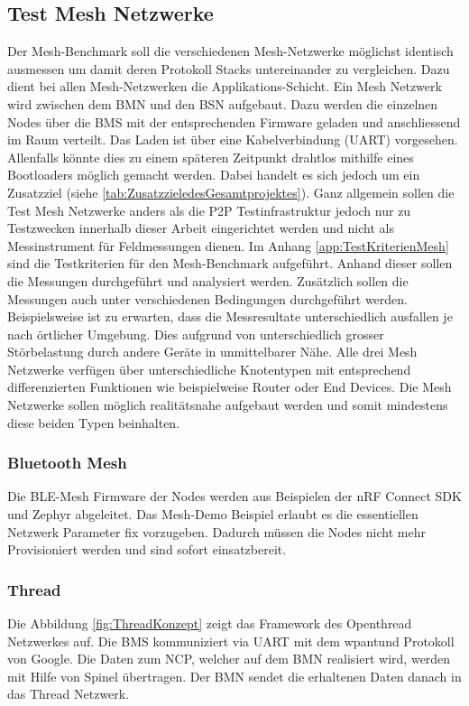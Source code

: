 \subsection{Test Mesh Netzwerke}\label{subsec:TestMeshNetzwerke}

Der Mesh-Benchmark soll die verschiedenen Mesh-Netzwerke möglichst identisch ausmessen um damit deren Protokoll Stacks untereinander zu vergleichen. Dazu dient bei allen Mesh-Netzwerken die Applikations-Schicht. Ein Mesh Netzwerk wird zwischen dem BMN und den BSN aufgebaut. Dazu werden die einzelnen Nodes über die BMS mit der entsprechenden Firmware geladen und anschliessend im Raum verteilt. Das Laden ist über eine Kabelverbindung (UART) vorgesehen. Allenfalls könnte dies zu einem späteren Zeitpunkt drahtlos mithilfe eines Bootloaders möglich gemacht werden. Dabei handelt es sich jedoch um ein Zusatzziel (siehe \ref{tab:ZusatzzieledesGesamtprojektes}). Ganz allgemein sollen die Test Mesh Netzwerke anders als die P2P Testinfrastruktur jedoch nur zu Testzwecken innerhalb dieser Arbeit eingerichtet werden und nicht als Messinstrument für Feldmessungen dienen.
Im Anhang \ref{app:TestKriterienMesh} sind die Testkriterien für den Mesh-Benchmark aufgeführt. Anhand dieser sollen die Messungen durchgeführt und analysiert werden. Zusätzlich sollen die Messungen auch unter verschiedenen Bedingungen durchgeführt werden. Beispielsweise ist zu erwarten, dass die Messresultate unterschiedlich ausfallen je nach örtlicher Umgebung. Dies aufgrund von unterschiedlich grosser Störbelastung durch andere Geräte in unmittelbarer Nähe.
Alle drei Mesh Netzwerke verfügen über unterschiedliche Knotentypen mit entsprechend differenzierten Funktionen wie beispielweise Router oder End Devices. Die Mesh Netzwerke sollen möglich realitätsnahe aufgebaut werden und somit mindestens diese beiden Typen beinhalten. 

\subsubsection{Bluetooth Mesh}\label{subsubsection:Bluetooth Mesh}

Die BLE-Mesh Firmware der Nodes werden aus Beispielen der nRF Connect SDK und Zephyr abgeleitet. Das Mesh-Demo Beispiel erlaubt es die essentiellen Netzwerk Parameter fix vorzugeben. Dadurch müssen die Nodes nicht mehr Provisioniert werden und sind sofort einsatzbereit.


\subsubsection{Thread}\label{subsubsection:Thread} 
Die Abbildung \ref{fig:ThreadKonzept} zeigt das Framework des Openthread Netzwerkes auf. Die BMS kommuniziert via UART mit dem wpantund Protokoll von Google. Die Daten zum NCP, welcher auf dem BMN realisiert wird, werden mit Hilfe von Spinel übertragen. Der BMN sendet die erhaltenen Daten danach in das Thread Netzwerk.

